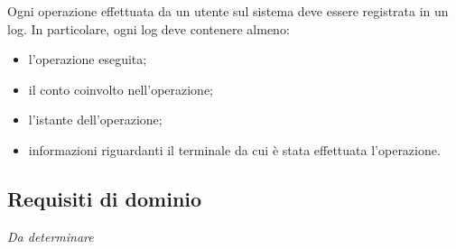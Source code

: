 Ogni operazione effettuata da un utente sul sistema deve essere registrata in un log.
In particolare, ogni log deve contenere almeno:
\begin{itemize}
	\item l'operazione eseguita;
	\item il conto coinvolto nell'operazione;
	\item l'istante dell'operazione;
	\item informazioni riguardanti il terminale da cui \`e stata effettuata l'operazione.
\end{itemize}

\subsection{Requisiti di dominio}

\emph{Da determinare}
